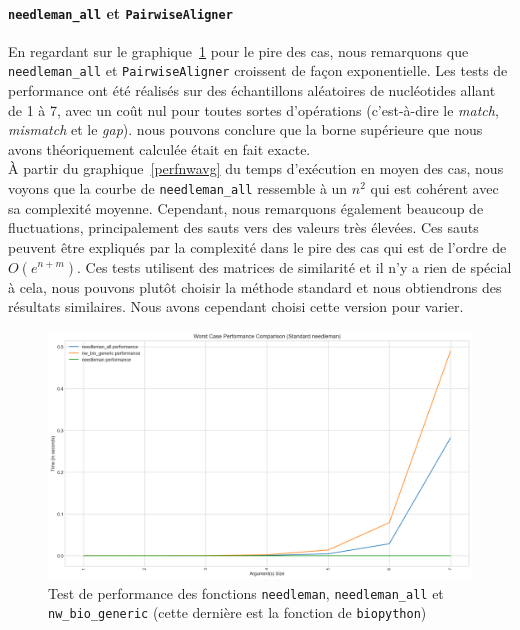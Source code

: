 \documentclass[12pt]{article}
\begin{document}
\paragraph{\texttt{needleman\_all} et \texttt{PairwiseAligner}}
En regardant sur le graphique~\ref{perfnwpire} pour le pire des cas, nous remarquons que \texttt{needleman\_all} et \texttt{PairwiseAligner} croissent de façon exponentielle. Les tests de performance ont été réalisés sur des échantillons aléatoires de nucléotides allant de 1 à 7, avec un coût nul pour toutes sortes d'opérations (c'est-à-dire le \textsl{match}, \textsl{mismatch} et le \textsl{gap}). nous pouvons conclure que la borne supérieure que nous avons théoriquement calculée était en fait exacte.\\
À partir du graphique~\ref{perfnwavg} du temps d'exécution en moyen des cas, nous voyons que la courbe de \texttt{needleman\_all} ressemble à un $n^2$ qui est cohérent avec sa complexité moyenne. Cependant, nous remarquons également beaucoup de fluctuations, principalement des sauts vers des valeurs très élevées. Ces sauts peuvent être expliqués par la complexité dans le pire des cas qui est de l'ordre de $O(e^{n+m})$. Ces tests utilisent des matrices de similarité et il n'y a rien de spécial à cela, nous pouvons plutôt choisir la méthode standard et nous obtiendrons des résultats similaires. Nous avons cependant choisi cette version pour varier.\\
    \begin{figure}[!h]
        \centering
        \includegraphics[scale=0.4]{Images/Performance/Needleman-Wunsch/performance_needleman_pire_cas.png}
        \caption{Test de performance des fonctions \texttt{needleman}, \texttt{needleman\_all} et \texttt{nw\_bio\_generic} (cette dernière est la fonction de \texttt{biopython})}
        \label{perfnwpire}
    \end{figure}
\end{document}
